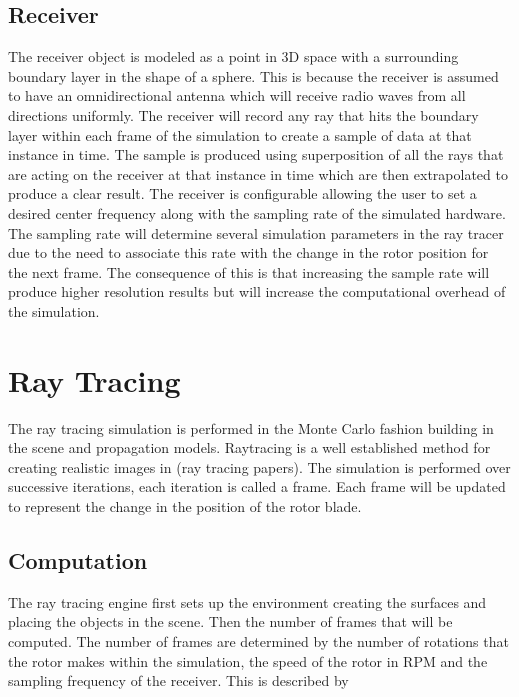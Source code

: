 \subsection{Receiver}
The receiver object is modeled as a point in 3D space with a surrounding boundary layer in the shape of a sphere. This is because the receiver is assumed to have an omnidirectional antenna which will receive radio waves from all directions uniformly. The receiver will record any ray that hits the boundary layer within each frame of the simulation to create a sample of data at that instance in time.
The sample is produced using superposition of all the rays that are acting on the receiver at that instance in time which are then extrapolated to produce a clear result.
The receiver is configurable allowing the user to set a desired center frequency along with the sampling rate of the simulated hardware. The sampling rate will determine several simulation parameters in the ray tracer due to the need to associate this rate with the change in the rotor position for the next frame. The consequence of this is that increasing the sample rate will produce higher resolution results but will increase the computational overhead of the simulation.

\section{Ray Tracing}
The ray tracing simulation is performed in the Monte Carlo fashion building in the scene and propagation models. Raytracing is a well established method for creating realistic images in (ray tracing papers). The simulation is performed over successive iterations, each iteration is called a frame. Each frame will be updated to represent the change in the position of the rotor blade.

\subsection{Computation}
The ray tracing engine first sets up the environment creating the surfaces and placing the objects in the scene. Then the number of frames that will be computed. The number of frames are determined by the number of rotations that the rotor makes within the simulation, the speed of the rotor in RPM and the sampling frequency of the receiver. This is described by

